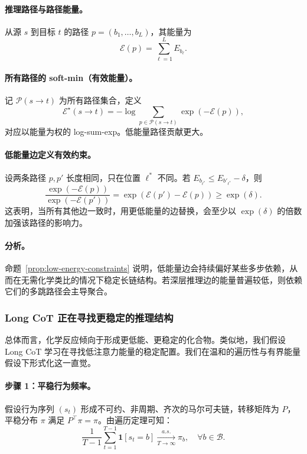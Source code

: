 \paragraph{推理路径与路径能量。}
从源 $s$ 到目标 $t$ 的路径 $p=(b_1,\ldots,b_L)$，其能量为
\begin{equation}
\mathcal{E}(p)=\sum_{\ell=1}^{L} E_{b_\ell}.
\end{equation}

\paragraph{所有路径的 soft-min（有效能量）。}
记 $\mathcal{P}(s\to t)$ 为所有路径集合，定义
\begin{equation}
\mathcal{E}^\star(s\to t) = -\log \sum_{p\in\mathcal{P}(s\to t)} \exp(-\mathcal{E}(p)),
\end{equation}
对应以能量为权的 log-sum-exp。低能量路径贡献更大。

\paragraph{低能量边定义有效约束。}
设两条路径 $p,p'$ 长度相同，只在位置 $\ell^*$ 不同。若 $E_{b_{\ell^*}} \le E_{b'_{\ell^*}}-\delta$，则
\begin{equation}
\frac{\exp(-\mathcal{E}(p))}{\exp(-\mathcal{E}(p'))} = \exp(\mathcal{E}(p')-\mathcal{E}(p)) \ge \exp(\delta).
\end{equation}
这表明，当所有其他边一致时，用更低能量的边替换，会至少以 $\exp(\delta)$ 的倍数加强该路径的影响力。

\paragraph{分析。}
命题~\ref{prop:low-energy-constraints} 说明，低能量边会持续偏好某些多步依赖，从而在无需化学类比的情况下稳定长链结构。若深层推理边的能量普遍较低，则依赖它们的多跳路径会主导聚合。

\subsubsection{Long CoT 正在寻找更稳定的推理结构}
总体而言，化学反应倾向于形成更低能、更稳定的化合物。类似地，我们假设 Long CoT 学习在寻找低注意力能量的稳定配置。我们在温和的遍历性与有界能量假设下形式化这一直觉。

\paragraph{步骤 1：平稳行为频率。}
假设行为序列 \((s_t)\) 形成不可约、非周期、齐次的马尔可夫链，转移矩阵为 $P$，平稳分布 $\pi$ 满足 $P^\top \pi=\pi$。由遍历定理可知：
\begin{equation}
\frac{1}{T-1}\sum_{t=1}^{T-1}\mathbf{1}[s_t=b] \xrightarrow[T\to\infty]{a.s.} \pi_b, \quad \forall b\in\mathcal{B}.
\end{equation}
\vspace{-5pt}
